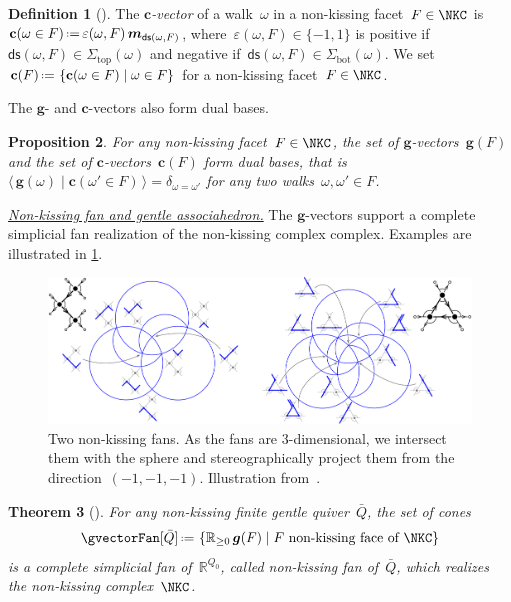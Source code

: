 \documentclass{amsart}
\newtheorem{theorem}{Theorem}[section]
\newtheorem{proposition}[theorem]{Proposition}
\theoremstyle{definition}
\newtheorem{definition}[theorem]{Definition}
\newcommand{\R}{\mathbb{R}} %
\renewcommand{\b}[1]{{\boldsymbol{#1}}} %
\newcommand{\set}[2]{\left\{ #1 \;\middle|\; #2 \right\}} %
\newcommand{\bigdotprod}[2]{\big\langle \, #1 \; \big| \; #2 \, \big\rangle} %
\newcommand{\eqdef}{\mbox{\,\raisebox{0.2ex}{\scriptsize\ensuremath{\mathrm:}}\ensuremath{=}\,}} %
\newcommand{\darkblue}{\color{darkblue}} %
\newcommand{\defn}[1]{\textsl{\darkblue #1}} %
\newcommand{\para}[1]{\medskip\noindent\uline{\textit{#1.}}} %
\newcommand{\multiplicityVector}{\b{m}} %
\newcommand{\gvector}[1]{\b{g}(#1)} %
\newcommand{\gvectors}[1]{\b{g}(#1)} %
\newcommand{\cvector}[2]{\mathbf{c}(#2 \in #1)} %
\newcommand{\cvectors}[1]{\mathbf{c}(#1)} %
\newcommand{\quiver}{\bar Q} %
\renewcommand{\top}{\mathrm{top}} %
\newcommand{\bottom}{\mathrm{bot}} %
\newcommand{\distinguishedString}[2]{\mathsf{ds}(#1,#2)} %
\newcommand{\distinguishedSign}[2]{\varepsilon(#1,#2)} %
\begin{document}
\begin{definition}[{\cite[Def.~{4.11}]{PaluPilaudPlamondon-nonkissing}}]
The \defn{$\b{c}$-vector} of a walk~$\omega$ in a non-kissing facet~${F \in \NKC}$ is~${\cvector{F}{\omega} \eqdef \distinguishedSign{\omega}{F} \, \multiplicityVector_{\distinguishedString{\omega}{F}}}$, where~$\distinguishedSign{\omega}{F} \in \{-1,1\}$ is positive if~${\distinguishedString{\omega}{F} \in \Sigma_\top(\omega)}$ and negative if~${\distinguishedString{\omega}{F} \in \Sigma_\bottom(\omega)}$.
We set~$\cvectors{F} \eqdef \set{\cvector{F}{\omega}}{\omega \in F}$ for a non-kissing facet~$F \in \NKC$.
\end{definition}

The $\b{g}$- and $\b{c}$-vectors also form dual bases.

\begin{proposition}
\label{prop:gvectorscvectorsDualBasesGentle}
For any non-kissing facet~$F \in \NKC$, the set of $\b{g}$-vectors~$\gvectors{F}$ and the set of $\b{c}$-vectors~$\cvectors{F}$ form dual bases, that is
\(
{\bigdotprod{\gvector{\omega}}{\cvector{F}{\omega'}} = \delta_{\omega=\omega'}}
\)
for any two walks~$\omega, \omega' \in F$.
\end{proposition}

\para{Non-kissing fan and gentle associahedron}
%
The $\b{g}$-vectors support a complete simplicial fan realization of the non-kissing complex complex.
Examples are illustrated in \cref{fig:nonkissingFans}.

\begin{figure}[h]
	\capstart
	\centerline{\includegraphics[scale=.45]{nonkissingFans}}
	\caption{Two non-kissing fans. As the fans are $3$-dimensional, we intersect them with the sphere and stereographically project them from the direction~$(-1,-1,-1)$. Illustration from~\cite{PaluPilaudPlamondon-nonkissing}.}
	\label{fig:nonkissingFans}
\end{figure}

\begin{theorem}[{\cite[Thm.~4.17]{PaluPilaudPlamondon-nonkissing}}]
\label{thm:nonkissingFan}
For any non-kissing finite gentle quiver~$\quiver$, the set of cones
\[
\gvectorFan[\quiver] \eqdef \set{\R_{\ge 0} \, \gvectors{F}}{F \text{ non-kissing face of } \NKC}
\]
is a complete simplicial fan of~$\R^{Q_0}$, called \defn{non-kissing fan} of~$\quiver$, which realizes the non-kissing complex~$\NKC$.
\end{theorem}
\end{document}
